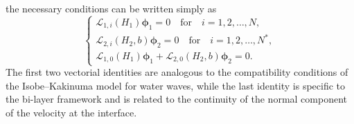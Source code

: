 \documentclass[11pt,leqno]{article}
\numberwithin{equation}{section}
\numberwithin{figure}{section}
\begin{document}
%
the necessary conditions can be written simply as 
%
\begin{equation}\label{intro:necessary}
	\begin{cases}
		\mathcal{L}_{1,i}(H_1) {\bm \phi}_1 = 0 \quad\mbox{for}\quad i=1,2,\ldots,N, \\
		\mathcal{L}_{2,i}(H_2,b) {\bm \phi}_2 = 0 \quad\mbox{for}\quad i=1,2,\ldots,N^*, \\
		\mathcal{L}_{1,0}(H_1) {\bm \phi}_1
		+ \mathcal{L}_{2,0}(H_2,b) {\bm \phi}_2  = 0.
	\end{cases}
\end{equation}
%
The first two vectorial identities are analogous to the compatibility conditions of the Isobe--Kakinuma model for water waves, 
while the last identity is specific to the bi-layer framework and is related to the continuity of the normal component of the velocity at the interface. 
\end{document}
